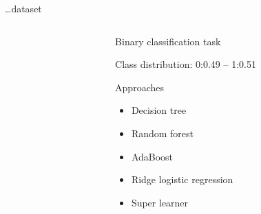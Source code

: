 

\begin{frame}{\dots dataset}

\begin{columns}[T]
\begin{column}{0.5\textwidth}

\end{column}
\begin{column}{0.5\textwidth}
Binary classification task%

Class distribution: 0:0.49 -- 1:0.51

Approaches
\begin{itemize}
	\item Decision tree
	\item Random forest
	\item AdaBoost
	\item Ridge logistic regression
	\item Super learner
\end{itemize}
\end{column}
\end{columns}

\end{frame}



